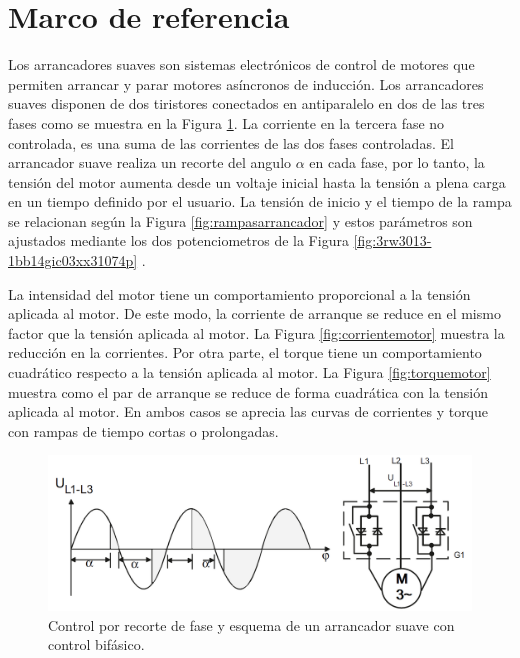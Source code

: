 \section{Marco de referencia}


Los arrancadores suaves son sistemas electrónicos de control de motores que permiten arrancar y parar motores asíncronos de inducción. Los arrancadores suaves disponen de dos tiristores conectados en antiparalelo en dos de las tres fases como se muestra en la Figura \ref{fig:controlfase}. La corriente en la tercera fase no controlada, es una suma de las corrientes de las dos fases controladas. El arrancador suave realiza un recorte del angulo $\alpha$ en cada fase, por lo tanto, la tensión del motor aumenta desde un voltaje inicial hasta la tensión a plena carga en un tiempo definido por el usuario. La tensión de inicio y el tiempo de la rampa se relacionan según la Figura \ref{fig:rampasarrancador} y estos parámetros son ajustados mediante los dos potenciometros de la Figura \ref{fig:3rw3013-1bb14gic03xx31074p} .

La intensidad del motor tiene un comportamiento proporcional a la tensión aplicada al motor. De este modo, la corriente de arranque se reduce en el mismo factor que la tensión aplicada al motor. La Figura \ref{fig:corrientemotor} muestra la reducción en la corrientes. Por otra parte, el torque tiene un comportamiento cuadrático respecto a la tensión aplicada al motor. La Figura \ref{fig:torquemotor} muestra como el par de arranque se reduce de forma cuadrática con la tensión aplicada al motor. En ambos casos se aprecia las curvas de corrientes y torque con rampas de tiempo cortas o prolongadas.

\begin{figure}
	\centering
	\includegraphics[width=0.75\linewidth]{Imagenes/ControlFase}
	\caption{Control por recorte de fase y esquema de un arrancador suave con control bifásico. \cite{SIEMENS}}
	\label{fig:controlfase}
\end{figure}




